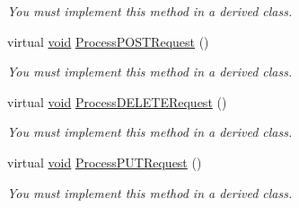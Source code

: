 \begin{DoxyCompactItemize}
\begin{DoxyCompactList}\small\item\em \-You must implement this method in a derived class. \end{DoxyCompactList}\item 
virtual \hyperlink{_cpclient_8h_a6464f7480a0fd0ee170cba12b2c0497f}{void} \hyperlink{class_c_g_i_c_plus_plus_a2f2776ae8909abdf3769c84415d64952}{\-Process\-P\-O\-S\-T\-Request} ()
\begin{DoxyCompactList}\small\item\em \-You must implement this method in a derived class. \end{DoxyCompactList}\item 
virtual \hyperlink{_cpclient_8h_a6464f7480a0fd0ee170cba12b2c0497f}{void} \hyperlink{class_c_g_i_c_plus_plus_a86c58f739d561752f70330f321a5351b}{\-Process\-D\-E\-L\-E\-T\-E\-Request} ()
\begin{DoxyCompactList}\small\item\em \-You must implement this method in a derived class. \end{DoxyCompactList}\item 
virtual \hyperlink{_cpclient_8h_a6464f7480a0fd0ee170cba12b2c0497f}{void} \hyperlink{class_c_g_i_c_plus_plus_af903fb45e8aea8b38d2d5f49b59c8e47}{\-Process\-P\-U\-T\-Request} ()
\begin{DoxyCompactList}\small\item\em \-You must implement this method in a derived class. \end{DoxyCompactList}\end{DoxyCompactItemize}
